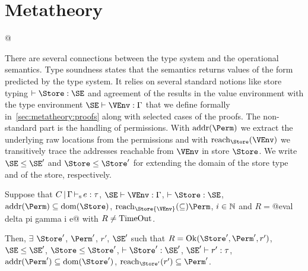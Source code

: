 \section{Metatheory}
\label{sec:metatheory}

\lstMakeShortInline[style=rule]@

There are several connections between the type system and
the operational semantics. Type soundness states
that the semantics returns values of the form predicted by the type
system. It relies on several standard notions like store typing
$\vdash \Store : \SE$ and agreement of the results in the value environment
with the type environment $\SE \vdash \VEnv:\E$ that we define
formally in~\cref{sec:metatheory:proofs} along with selected cases of the proofs. The
non-standard part is the handling of permissions. With
$\Addresses\Perm$ we extract the underlying raw locations from the
permissions and with $\Reach\Store\VEnv$ we transitively trace the
addresses reachable from $\VEnv$ in store $\Store$. We write
$\SE\le\SE'$ and $\Store \le \Store'$ for extending the domain of the
store type and of the store, respectively.

\begin{theorem}\label{theorem:type-soundness}
  Suppose that
    $C \operatorname{|} \Gamma \operatorname{\vdash_s} e : \tau$,
    $\SE \vdash \VEnv : \E$,
    $\vdash \Store : \SE$,
    $\Addresses\Perm \subseteq \Dom\Store$,
    $\Reach\Store{\VEnv} \subseteq \Perm$,
    $i\in\mathbb{N}$ and
    $R = $@eval delta pi gamma i e@
    with $R\ne \operatorname{TimeOut}$.

  Then,
  $\exists$ $\Store'$, $\Perm'$, $r'$, $\SE'$ such that
    $R = \Ok{\Store', \Perm', r'}$,
    $\SE \le \SE'$, $\Store \le \Store'$,
    $\vdash \Store' : \SE'$,
    $\SE' \vdash r' : \tau$,
    $\Addresses{\Perm'} \subseteq \Dom{\Store'}$,
    $\Reach{\Store'}{r'} \subseteq \Perm'$.
\end{theorem}

